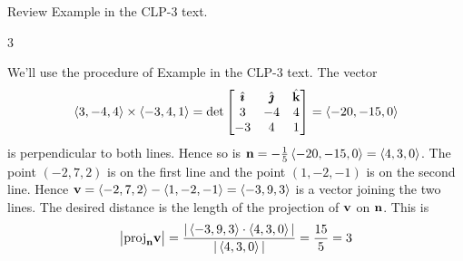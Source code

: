 \begin{hint}
Review Example 
in the CLP-3 text.
\end{hint}

\begin{answer}
$3$
\end{answer}

\begin{solution}
We'll use the procedure of Example 
in the CLP-3 text. 
The vector 
\begin{equation*}
\left< 3,-4,4\right> \times\left< -3,4,1\right> 
=\det\left[\begin{matrix}
           \hat{\pmb{\imath}} & \hat{\pmb{\jmath}} & \hat{\mathbf{k}} \\
           3  &  -4  &  4 \\
          -3  &   4  & 1
  \end{matrix}\right]
=\left< -20,-15,0\right> 
\end{equation*}
is perpendicular to both lines. Hence so is 
$\mathbf{n}=-\frac{1}{5}\left< -20,-15,0\right> =\left< 4,3,0\right> $. The point
$(-2,7,2)$ is on the first line and the point $(1,-2,-1)$ is on the second
line. Hence 
$\mathbf{v}=\left< -2,7,2 \right>-\left<1,-2,-1 \right>=\left< -3,9,3\right> $ is a vector 
joining the two lines. 
The desired distance is the length of the projection of $\mathbf{v}$ on $\mathbf{n}$. 
This is 
\begin{equation*}
\big|{\rm proj}_{\mathbf{n}}\mathbf{v}\big|
=\frac{|\left< -3,9,3\right> \cdot\left< 4,3,0\right>|}{|\left< 4,3,0\right>|} 
=\frac{15}{5}=3
\end{equation*}
\end{solution}


